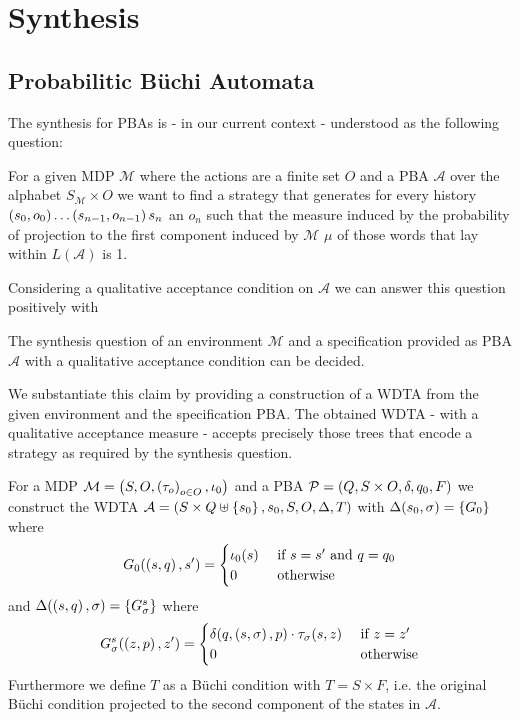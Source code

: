 \chapter{Synthesis}
\label{chapter:synthesis}
\section{Probabilitic Büchi Automata}
The synthesis for \acp{PBA} is - in our current context - understood as the
following question:
\begin{definition}
  For a given \ac{MDP} $\mathcal{M}$ where the actions are a finite set $O$ and
  a \ac{PBA} $\mathcal{A}$ over the alphabet $S_{\mathcal{M}}\times O$ we want
  to find a strategy that generates for every history
  $\left(s_{0}, o_{0}\right)\dots\left(s_{n-1},o_{n-1}\right)s_{n}$ an
  $o_{n}$ such that the measure induced by the probability of projection to the
  first component induced by $\mathcal{M}$ $\mu$ of those words that lay within
  $L(\mathcal{A})$ is 1.
\end{definition}
Considering a qualitative acceptance condition on $\mathcal{A}$ we can answer
this question positively with
\begin{theorem}
  The synthesis question of an environment $\mathcal{M}$ and a specification
  provided as \ac{PBA} $\mathcal{A}$ with a qualitative acceptance condition
  can be decided.
\end{theorem}
We substantiate this claim by providing a construction of a \ac{WDTA} from the
given environment and the specification \ac{PBA}. The obtained \ac{WDTA} - with
a qualitative acceptance measure - accepts precisely those trees that encode a
strategy as required by the synthesis question.
\begin{definition}
  For a \ac{MDP} $\mathcal{M} = \left(S, O, \left(\tau_{o}\right)_{o\in O},
  \iota_{0}\right)$ and a \ac{PBA} $\mathcal{P} = \left(Q, S\times O, \delta, q_{0},
  F\right)$ we construct the \ac{WDTA}
  $\mathcal{A} = \left(S\times Q\uplus\left\{s_{0}\right\}, s_{0}, S, O, \Delta,
  T\right)$ with $\Delta(s_{0}, \sigma) = \left\{G_{0}\right\}$ where
  \begin{equation*}
    G_{0}(\left(s,q\right), s') =
    \begin{cases}
      \iota_{0}(s)&\text{ if }s = s'\text{ and }q = q_{0}\\
      0 &\text{ otherwise}
    \end{cases}
  \end{equation*}
  and $\Delta(\left(s, q\right), \sigma) = \left\{G^{s}_{\sigma}\right\}$ where
  \begin{equation*}
    G^{s}_{\sigma}(\left(z,p\right), z') =
    \begin{cases}
      \delta(q, \left(s,\sigma\right), p)\cdot\tau_{\sigma}(s,z)&\text{ if }z = z'\\
      0 &\text{ otherwise}
    \end{cases}
  \end{equation*}
  Furthermore we define $T$ as a Büchi condition with $T = S\times F$, i.e. the
  original Büchi condition projected to the second component of the
  states in $\mathcal{A}$.
\end{definition}
